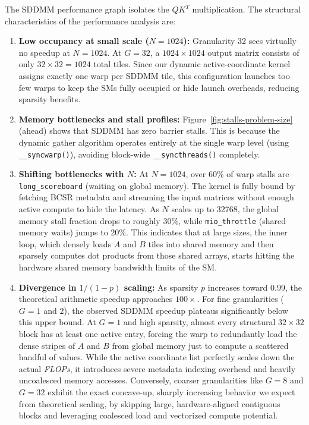 \documentclass[11pt]{article}
\begin{document}
The SDDMM performance graph isolates the $QK^T$ multiplication. The structural characteristics of the performance analysis are:
\begin{enumerate}
    \item \textbf{Low occupancy at small scale ($N=1024$):} Granularity 32 sees virtually no speedup at $N=1024$. At $G=32$, a $1024 \times 1024$ output matrix consists of only $32 \times 32 = 1024$ total tiles. Since our dynamic active-coordinate kernel assigns exactly one warp per SDDMM tile, this configuration launches too few warps to keep the SMs fully occupied or hide launch overheads, reducing sparsity benefits.
    \item \textbf{Memory bottlenecks and stall profiles:} Figure~\ref{fig:stalls-problem-size} (ahead) shows that SDDMM has zero barrier stalls. This is because the dynamic gather algorithm operates entirely at the single warp level (using \texttt{\_\_syncwarp()}), avoiding block-wide \texttt{\_\_syncthreads()} completely. 
    \item \textbf{Shifting bottlenecks with $N$:} At $N=1024$, over 60\% of warp stalls are \texttt{long\_scoreboard} (waiting on global memory). The kernel is fully bound by fetching BCSR metadata and streaming the input matrices without enough active compute to hide the latency. As $N$ scales up to 32768, the global memory stall fraction drops to roughly 30\%, while \texttt{mio\_throttle} (shared memory waits) jumps to 20\%. This indicates that at large sizes, the inner loop, which densely loads $A$ and $B$ tiles into shared memory and then sparsely computes dot products from those shared arrays, starts hitting the hardware shared memory bandwidth limits of the SM.
    \item \textbf{Divergence in $1/(1-p)$ scaling:} As sparsity $p$ increases toward $0.99$, the theoretical arithmetic speedup approaches $100\times$. For fine granularities ($G=1$ and $2$), the observed SDDMM speedup plateaus significantly below this upper bound. At $G=1$ and high sparsity, almost every structural $32 \times 32$ block has at least one active entry, forcing the warp to redundantly load the dense stripes of $A$ and $B$ from global memory just to compute a scattered handful of values. While the active coordinate list perfectly scales down the actual \textit{FLOPs}, it introduces severe metadata indexing overhead and heavily uncoalesced memory accesses. Conversely, coarser granularities like $G=8$ and $G=32$ exhibit the exact concave-up, sharply increasing behavior we expect from theoretical scaling, by skipping large, hardware-aligned contiguous blocks and leveraging coalesced load and vectorized compute potential.
\end{enumerate}
\end{document}
